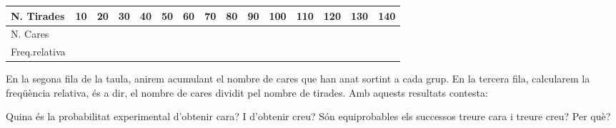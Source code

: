 \begin{mylist}
\begin{longtable}{|p{0.7in}|p{0.2in}|p{0.2in}|p{0.2in}|p{0.2in}|p{0.2in}|p{0.2in}|p{0.2in}|p{0.2in}|p{0.2in}|p{0.2in}|p{0.2in}|p{0.2in}|p{0.2in}|p{0.2in}|} \hline 
N. Tirades & 10 & 20 & 30 & 40 & 50 & 60 & 70 & 80 & 90 & 100 & 110 & 120 & 130 & 140 \\ \hline 
N. Cares &  &  &  &  &  &  &  &  &  &  &  &  &  &  \\ \hline 
Freq.\newline relativa &  &  &  &  &  &  &  &  &  &  &  &  &  &  \\ \hline 
\end{longtable}
  En la segona fila de la taula, anirem acumulant el nombre de cares que han anat sortint a cada grup. En la tercera fila, calcularem la freqüència relativa, és a dir, el nombre de cares dividit pel nombre de tirades. Amb aquests resultats contesta:
\begin{tasks} 
\task Quina és la probabilitat experimental d'obtenir cara? I d'obtenir creu?
\task Són equiprobables els successos treure cara i treure creu? Per què?
\end{tasks}



\end{mylist}
